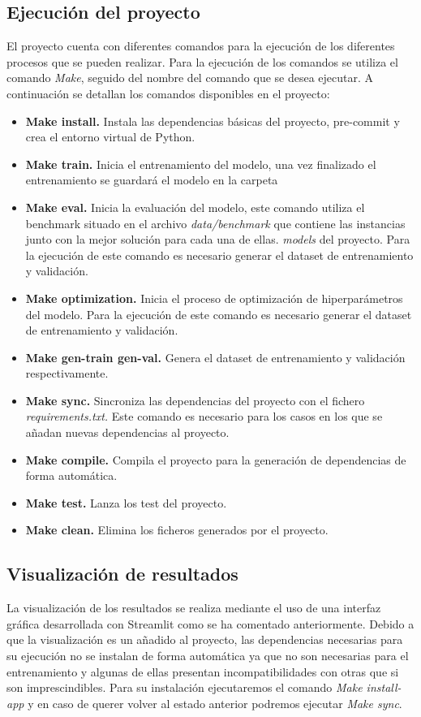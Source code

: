 \subsection{Ejecución del proyecto}
El proyecto cuenta con diferentes comandos para la ejecución de los
diferentes procesos que se pueden realizar. Para la ejecución de los
comandos se utiliza el comando \textit{Make}, seguido del nombre del
comando que se desea ejecutar. A continuación se detallan los comandos
disponibles en el proyecto:
\begin{itemize}
    \item \textbf{Make install.} Instala las dependencias básicas del proyecto,
    pre-commit y crea el entorno virtual de Python.
    \item \textbf{Make train.} Inicia el entrenamiento del modelo, una vez
    finalizado el entrenamiento se guardará el modelo en la carpeta
    \item \textbf{Make eval.} Inicia la evaluación del modelo, este comando
    utiliza el benchmark situado en el archivo \textit{data/benchmark} que
    contiene las instancias junto con la mejor solución para cada una de ellas.
    \textit{models} del proyecto. Para la ejecución de este comando es
    necesario generar el dataset de entrenamiento y validación.
    \item \textbf{Make optimization.} Inicia el proceso de optimización
    de hiperparámetros del modelo. Para la ejecución de este comando es
    necesario generar el dataset de entrenamiento y validación.
    \item \textbf{Make gen-train gen-val.} Genera el dataset de entrenamiento
    y validación respectivamente.
    \item \textbf{Make sync.} Sincroniza las dependencias del proyecto con
    el fichero \textit{requirements.txt.} Este comando es necesario para
    los casos en los que se añadan nuevas dependencias al proyecto.
    \item \textbf{Make compile.} Compila el proyecto para la generación de
    dependencias de forma automática.
    \item \textbf{Make test.} Lanza los test del proyecto.
    \item \textbf{Make clean.} Elimina los ficheros generados por el proyecto.
\end{itemize}

\subsection{Visualización de resultados}
La visualización de los resultados se realiza mediante el uso de una interfaz 
gráfica desarrollada con Streamlit como se ha comentado anteriormente. 
Debido a que la visualización es un añadido al proyecto, las dependencias 
necesarias para su ejecución no se instalan de forma automática ya que no 
son necesarias para el entrenamiento y algunas de ellas presentan incompatibilidades
con otras que si son imprescindibles. Para su instalación ejecutaremos el
comando \textit{Make install-app} y en caso de querer volver al estado 
anterior podremos ejecutar \textit{Make sync}.\medskip

